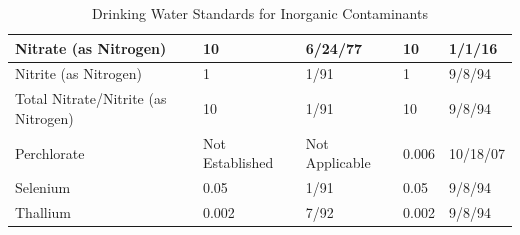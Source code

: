 \begin{table}[]
\begin{tabular}{|l|l|l|l|l|}
Nitrate   (as   Nitrogen)                 & 10                                                                 & 6/24/77                                                                                      & 10                                                                      & 1/1/16                      \\ \hline
Nitrite   (as   Nitrogen)                 & 1                                                                  & 1/91                                                                                         & 1                                                                       & 9/8/94                      \\ \hline
Total   Nitrate/Nitrite   (as   Nitrogen) & 10                                                                 & 1/91                                                                                         & 10                                                                      & 9/8/94                      \\ \hline
Perchlorate                               & Not   Established                                                  & Not   Applicable                                                                             & 0.006                                                                   & 10/18/07                    \\ \hline
Selenium                                  & 0.05                                                               & 1/91                                                                                         & 0.05                                                                    & 9/8/94                      \\ \hline
Thallium                                  & 0.002                                                              & 7/92                                                                                         & 0.002                                                                   & 9/8/94                      \\ \hline
\end{tabular}
\caption{Drinking Water Standards for Inorganic Contaminants}
\end{table}





















